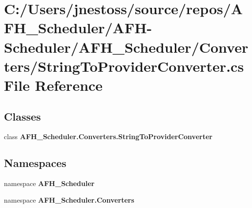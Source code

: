 \section{C\+:/\+Users/jnestoss/source/repos/\+A\+F\+H\+\_\+\+Scheduler/\+A\+F\+H-\/\+Scheduler/\+A\+F\+H\+\_\+\+Scheduler/\+Converters/\+String\+To\+Provider\+Converter.cs File Reference}
\label{_string_to_provider_converter_8cs}
\subsection*{Classes}
\begin{DoxyCompactItemize}
\item 
class \textbf{ A\+F\+H\+\_\+\+Scheduler.\+Converters.\+String\+To\+Provider\+Converter}
\end{DoxyCompactItemize}
\subsection*{Namespaces}
\begin{DoxyCompactItemize}
\item 
namespace \textbf{ A\+F\+H\+\_\+\+Scheduler}
\item 
namespace \textbf{ A\+F\+H\+\_\+\+Scheduler.\+Converters}
\end{DoxyCompactItemize}
